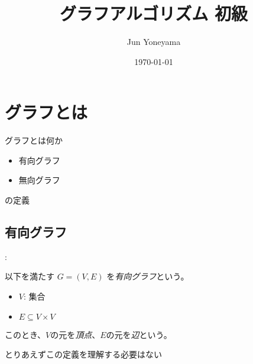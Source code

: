 \documentclass[dvipdfmx]{beamer}
\title{グラフアルゴリズム 初級}
\author{Jun Yoneyama}
\date{\today}
\begin{document}
\frame{\maketitle}

\section{グラフとは}

\begin{frame}{\insertsection}
  \begin{block}{グラフとは何か}
    \begin{itemize}
      \item 有向グラフ
      \item 無向グラフ
    \end{itemize}
    の定義
  \end{block}
\end{frame}

\subsection{有向グラフ}

\begin{frame}{\insertsection: \insertsubsection}
  \begin{definition}
    以下を満たす $G = (V, E)$ を\emph{有向グラフ}という。
    \begin{itemize}
      \item $V$: 集合
      \item $E \subseteq V \times V$
    \end{itemize}
    このとき、$V$の元を\emph{頂点}、$E$の元を\emph{辺}という。
  \end{definition}
  \pause
  \alert{とりあえずこの定義を理解する必要はない}
\end{frame}
\end{document}
